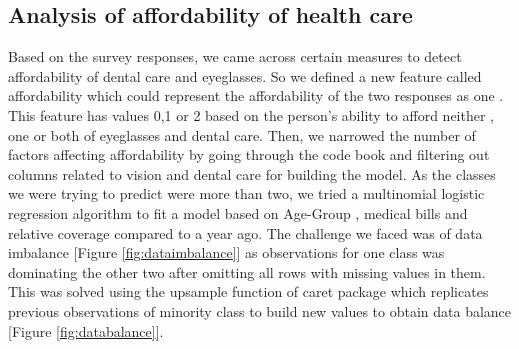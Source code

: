 \documentclass[12pt]{article}
\begin{document}
\subsection{Analysis of affordability of health care}
Based on the survey responses, we came across certain measures to detect affordability of dental care and eyeglasses. So we defined a new feature called affordability which could represent the affordability of the two responses as one . This feature has values 0,1 or 2 based on the person’s ability to afford neither , one or both of eyeglasses and dental care.
Then, we narrowed the number of factors affecting affordability by going through the code book and filtering out columns related to vision and dental care for building the model. 
As the classes we were trying to predict were more than two,  we tried a multinomial logistic regression algorithm to fit a model based on Age-Group , medical bills and relative coverage compared to a year ago.
The challenge we faced was of data imbalance [Figure \ref{fig:dataimbalance}] as observations for one class was dominating the other two after omitting all rows with missing values in them. This was solved using the upsample function of caret package which replicates previous observations of minority class to build new values to obtain data balance [Figure \ref{fig:databalance}].
\end{document}
